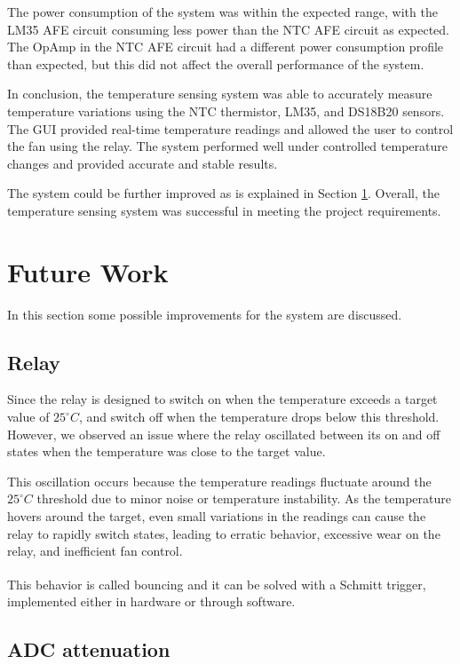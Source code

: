 \documentclass[12pt]{article}
\begin{document}
    The power consumption of the system was within the expected range, with the LM35 AFE circuit consuming less power than the NTC AFE circuit as expected. The OpAmp in the NTC AFE circuit had a different power consumption profile than expected, but this did not affect the overall performance of the system.

    In conclusion, the temperature sensing system was able to accurately measure temperature variations using the NTC thermistor, LM35, and DS18B20 sensors. The GUI provided real-time temperature readings and allowed the user to control the fan using the relay. The system performed well under controlled temperature changes and provided accurate and stable results.

    The system could be further improved as is explained in Section \ref{future-work}. Overall, the temperature sensing system was successful in meeting the project requirements.

    
\section{Future Work}
\label{future-work}

    In this section some possible improvements for the system are discussed.
    
    \subsection{Relay}
    
    Since the relay is designed to switch on when the temperature exceeds a target value of $25^\circ C$, and switch off when the temperature drops below this threshold. However, we observed an issue where the relay oscillated between its on and off states when the temperature was close to the target value. 

    This oscillation occurs because the temperature readings fluctuate around the $25^\circ C$ threshold due to minor noise or temperature instability. As the temperature hovers around the target, even small variations in the readings can cause the relay to rapidly switch states, leading to erratic behavior, excessive wear on the relay, and inefficient fan control.

    This behavior is called bouncing \textsuperscript{ \cite{9061500} } and it can be solved with a Schmitt trigger, implemented either in hardware or through software.

\subsection{ADC attenuation}
\end{document}
